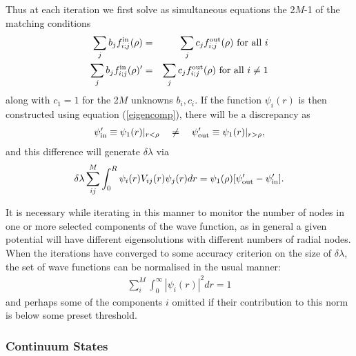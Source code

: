 \documentclass[11pt,a4paper]{article}
\begin{document}
Thus at each iteration we first solve as simultaneous equations the
2$M$-1 of the matching conditions
\begin{eqnarray}
      \sum _ j  b_j f_{i;j}^{\rm in} (\rho)
&=& \sum _ j  c_j f_{i;j}^{\rm out} (\rho) \mbox{  for all } i
\\
      \sum _ j  b_j f_{i;j}^{\rm in} (\rho)'
&=& \sum _ j  c_j f_{i;j}^{\rm out} (\rho) \mbox{  for all } i \neq 1
\end{eqnarray}
along with $c_1 =1$ for the 2$M$ unknowns $b_i , c_i$. If the function
$\psi_i (r) $ is then constructed using equation (\ref{eigencomp}),
there will be a discrepancy as
\begin{eqnarray}
\psi'_ {\rm in}  \equiv\psi_1 (r)  | _ {r< \rho}  ~~~ \neq ~~~
\psi'_ {\rm out} \equiv\psi_1 (r)  | _ {r> \rho} ,
\end{eqnarray}
and this difference will generate $\delta \lambda$ via
\begin{eqnarray}
\delta \lambda \sum _ {ij} ^ M
   \int_ 0 ^ R \psi_i (r) V_{ij} (r)\psi_j (r) dr
=\psi_1 (\rho) [ \psi'_ {\rm out} -\psi'_ {\rm in} ].
\end{eqnarray}

It is necessary while iterating in this manner to monitor the number of
nodes in one or more selected components of the wave function,
as in general a given potential will have different eigensolutions with
different numbers of radial nodes.  When the iterations have converged to
some accuracy criterion on the size of $\delta\lambda$, the set of wave
functions can be normalised in the usual manner:
\begin{eqnarray}
   \sum _ i ^ M \int _ 0 ^ \infty
      | \psi_i (r)| ^2 dr  = 1
\end{eqnarray}
and perhaps some of the components $i$ omitted if their contribution to
this norm is below some preset threshold.

\subsubsection{Continuum States}
\end{document}
